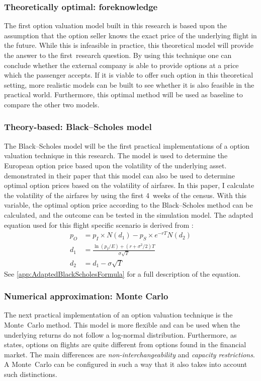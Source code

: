\subsubsection{Theoretically optimal: foreknowledge}
The first option valuation model built in this research is based upon the assumption that the option seller knows the exact price of the underlying flight in the future. While this is infeasible in practice, this theoretical model will provide the answer to the first~research question. By using this technique one can conclude whether the external company is able to provide options at a price which the passenger accepts. If it is viable to offer such option in this theoretical setting, more realistic models can be built to see whether it is also feasible in the practical world. Furthermore, this optimal method will be used as baseline to compare the other two models. 

\subsubsection{Theory-based: Black--Scholes model}
The Black--Scholes model will be the first practical implementations of a option valuation technique in this research. The model is used to determine the European option price based upon the volatility of the underlying asset.  demonstrated in their paper that this model can also be used to determine optimal option prices based on the volatility of airfares. In this paper, I calculate the volatility of the airfares by using the first 4~weeks of the census. With this variable, the optimal option price according to the Black--Scholes method can be calculated, and the outcome can be tested in the simulation model. The adapted equation used for this flight specific scenario is derived from :
\begin{align*}
p_O &= p_I \times N(d_1) - p_S \times e^{-rT}N(d_2) \\
d_1 &= \frac{\ln(p_I/E) + (r + \sigma^2/2)T}{\sigma \sqrt{T}} \\
d_2 &= d_1 - \sigma \sqrt{T}
\end{align*}
See \cref{app:AdaptedBlackScholesFormula} for a full description of the equation.

\subsubsection{Numerical approximation: Monte Carlo}
The next practical implementation of an option valuation technique is the Monte~Carlo method. This model is more flexible and can be used when the underlying returns do not follow a log-normal distribution. Furthermore, as  states, options on flights are quite different from options found in the financial market. The main differences are \emph{non-interchangeability} and \emph{capacity restrictions}. A Monte~Carlo can be configured in such a way that it also takes into account such distinctions.

